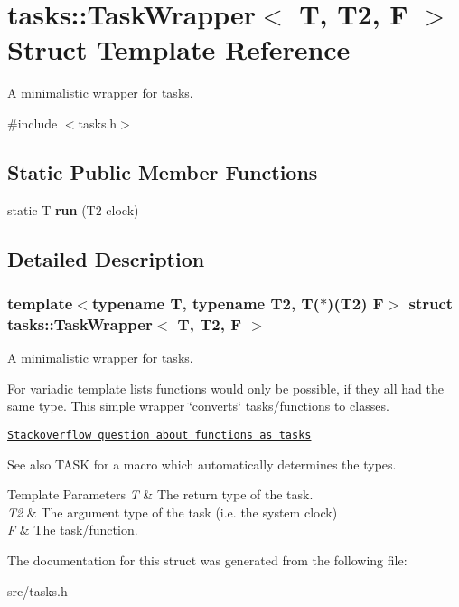 \hypertarget{structtasks_1_1TaskWrapper}{}\section{tasks\+:\+:Task\+Wrapper$<$ T, T2, F $>$ Struct Template Reference}
\label{structtasks_1_1TaskWrapper}


A minimalistic wrapper for tasks.  




{\ttfamily \#include $<$tasks.\+h$>$}

\subsection*{Static Public Member Functions}
\begin{DoxyCompactItemize}
\item 
\hypertarget{structtasks_1_1TaskWrapper_a5c8d691a2819950cfbe7ec400c85f845}{}\label{structtasks_1_1TaskWrapper_a5c8d691a2819950cfbe7ec400c85f845} 
static T {\bfseries run} (T2 clock)
\end{DoxyCompactItemize}


\subsection{Detailed Description}
\subsubsection*{template$<$typename T, typename T2, T($\ast$)(\+T2) F$>$\newline
struct tasks\+::\+Task\+Wrapper$<$ T, T2, F $>$}

A minimalistic wrapper for tasks. 

For variadic template lists functions would only be possible, if they all had the same type. This simple wrapper \char`\"{}converts\char`\"{} tasks/functions to classes.

\href{http://stackoverflow.com/questions/40387760/functions-as-template-arguments}{\tt Stackoverflow question about functions as tasks}

\begin{DoxySeeAlso}{See also}
T\+A\+SK for a macro which automatically determines the types.
\end{DoxySeeAlso}

\begin{DoxyTemplParams}{Template Parameters}
{\em T} & The return type of the task. \\
\hline
{\em T2} & The argument type of the task (i.\+e. the system clock) \\
\hline
{\em F} & The task/function. \\
\hline
\end{DoxyTemplParams}


The documentation for this struct was generated from the following file\+:\begin{DoxyCompactItemize}
\item 
src/tasks.\+h\end{DoxyCompactItemize}
